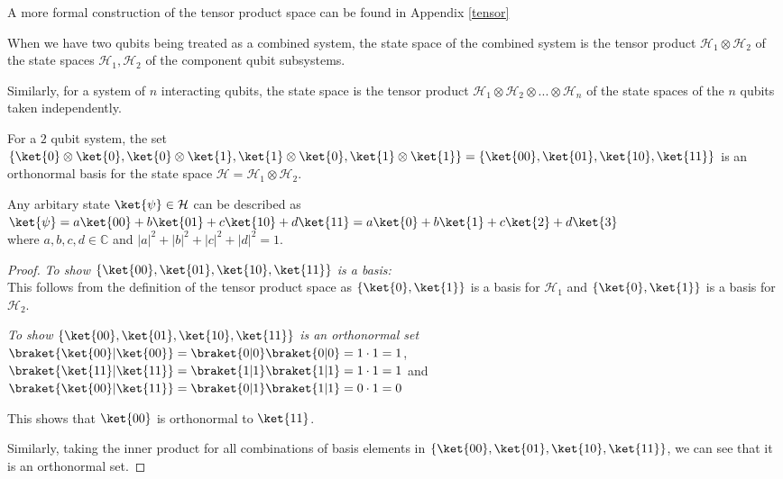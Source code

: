 \begin{note}
    A more formal construction of the tensor product space can be found in Appendix \ref{tensor}
\end{note}



\begin{samepage}
    \begin{mdframed}
\begin{axiom}
When we have two qubits being treated as a combined system, the state space of the combined system is the tensor product $\mathcal{H}_1 \otimes \mathcal{H}_2$ of the state spaces $\mathcal{H}_1, \mathcal{H}_2$ of the component qubit subsystems. 

    Similarly, for a system of $n$ interacting qubits, the state space is the tensor product $\mathcal{H}_1 \otimes \mathcal{H}_2 \otimes ... \otimes \mathcal{H}_n$ of the state spaces of the $n$ qubits taken independently.
\end{axiom}
    \end{mdframed}
\end{samepage}


\begin{prop}
    For a $2$ qubit system, the set $\{ \ket{0} \otimes \ket{0}, \ket{0} \otimes \ket{1}, \ket{1} \otimes \ket{0}, \ket{1} \otimes \ket{1} \} = \{ \ket{00}, \ket{01}, \ket{10}, \ket{11} \}$ is an orthonormal basis for the state space $\mathcal{H} = \mathcal{H}_1 \otimes \mathcal{H}_2$.

    Any arbitary state $\ket{\psi} \in \mathcal{H}$ can be described as $\ket{\psi} = a \ket{00} + b \ket{01} + c \ket{10} + d \ket{11} = a \ket{0} + b \ket{1} + c \ket{2} + d \ket{3}$ \\ where $a, b, c, d \in \mathbb{C}$ and $|a|^2 + |b|^2 + |c|^2 + |d|^2 = 1$.
\end{prop}
\begin{proof}
    \emph{To show  $\{ \ket{00}, \ket{01}, \ket{10}, \ket{11} \}$ is a basis: } \\

    This follows from the definition of the tensor product space as $\{ \ket{0}, \ket{1} \}$ is a basis for $\mathcal{H}_1$ and $\{ \ket{0}, \ket{1} \}$ is a basis for $\mathcal{H}_2$.

    \emph{To show $\{ \ket{00}, \ket{01}, \ket{10}, \ket{11} \}$ is an orthonormal set} \\
    $\braket{ \ket{00} | \ket{00}} = \braket{0|0} \braket{0|0} = 1 \cdot 1 = 1$, 
    $\braket{ \ket{11} | \ket{11}} = \braket{1|1} \braket{1|1} = 1 \cdot 1 = 1$
    and $\braket{ \ket{00} | \ket{11}} = \braket{0|1} \braket{1|1} = 0 \cdot 1 = 0$

    This shows that $\ket{00}$ is orthonormal to $\ket{11}$. 

    Similarly, taking the inner product for all combinations of basis elements in $\{ \ket{00}, \ket{01}, \ket{10}, \ket{11} \}$, we can see that it is an orthonormal set.
\end{proof}

